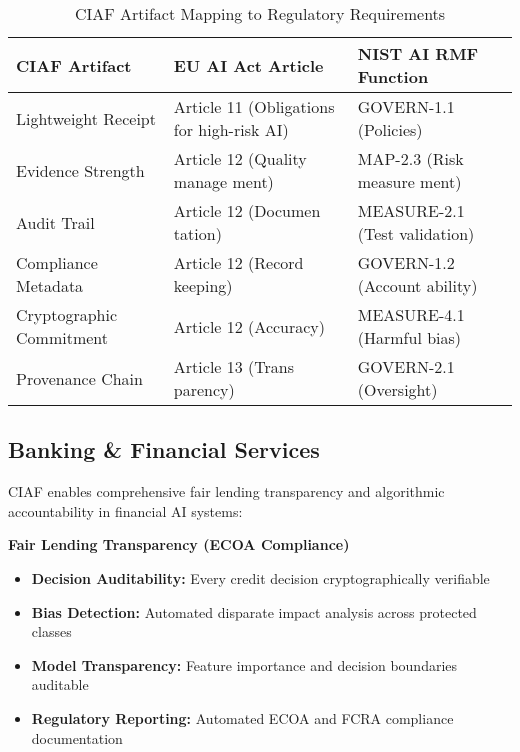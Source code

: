 \documentclass[12pt,a4paper]{article}
\begin{document}
\begin{table}[H]
\centering
\footnotesize
\renewcommand{\arraystretch}{1.3}
\begin{tabular}{|>{\raggedright\arraybackslash}p{3.5cm}|>{\raggedright\arraybackslash}p{5cm}|>{\raggedright\arraybackslash}p{4.5cm}|}
\hline
\textbf{CIAF Artifact} & \textbf{EU AI Act Article} & \textbf{NIST AI RMF Function} \\
\hline
Lightweight Receipt & Article 11 (Obligations for high-risk AI) & GOVERN-1.1 (Policies) \\
\hline
Evidence Strength & Article 12 (Quality manage ment) & MAP-2.3 (Risk measure ment) \\
\hline
Audit Trail & Article 12 (Documen tation) & MEASURE-2.1 (Test validation) \\
\hline
Compliance Metadata & Article 12 (Record keeping) & GOVERN-1.2 (Account ability) \\
\hline
Cryptographic Commitment & Article 12 (Accuracy) & MEASURE-4.1 (Harmful bias) \\
\hline
Provenance Chain & Article 13 (Trans parency) & GOVERN-2.1 (Oversight) \\
\hline
\end{tabular}
\caption{CIAF Artifact Mapping to Regulatory Requirements}
\label{tab:regulatory-mapping}
\end{table}

\subsection{Banking \& Financial Services}

CIAF enables comprehensive fair lending transparency and algorithmic accountability in financial AI systems:

\begin{valuebox}
\textbf{Fair Lending Transparency (ECOA Compliance)}
\begin{itemize}
\item \textbf{Decision Auditability:} Every credit decision cryptographically verifiable
\item \textbf{Bias Detection:} Automated disparate impact analysis across protected classes
\item \textbf{Model Transparency:} Feature importance and decision boundaries auditable
\item \textbf{Regulatory Reporting:} Automated ECOA and FCRA compliance documentation
\end{itemize}
\end{valuebox}
\end{document}
